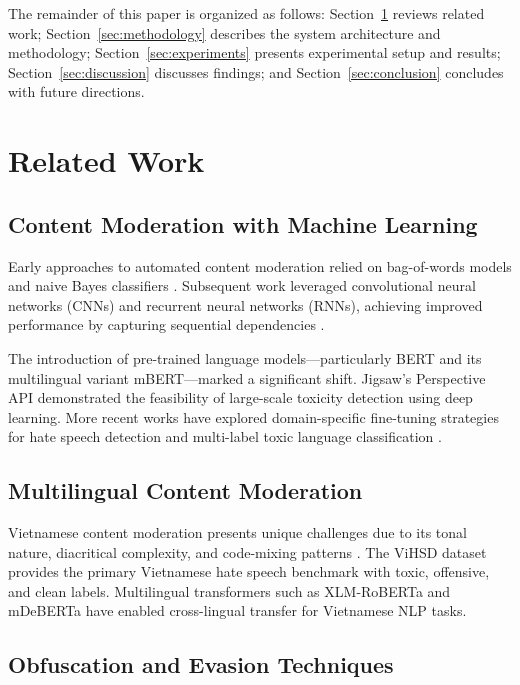 \documentclass[12pt,a4paper]{article}
\begin{document}
The remainder of this paper is organized as follows: Section~\ref{sec:related} reviews related work; Section~\ref{sec:methodology} describes the system architecture and methodology; Section~\ref{sec:experiments} presents experimental setup and results; Section~\ref{sec:discussion} discusses findings; and Section~\ref{sec:conclusion} concludes with future directions.

\section{Related Work}
\label{sec:related}

\subsection{Content Moderation with Machine Learning}

Early approaches to automated content moderation relied on bag-of-words models and naive Bayes classifiers \cite{warner2012detecting}.
Subsequent work leveraged convolutional neural networks (CNNs) and recurrent neural networks (RNNs), achieving improved performance by capturing sequential dependencies \cite{zhang2018leveraging, konchady2022using}.

The introduction of pre-trained language models---particularly BERT \cite{devlin2019bert} and its multilingual variant mBERT---marked a significant shift.
Jigsaw's Perspective API demonstrated the feasibility of large-scale toxicity detection using deep learning.
More recent works have explored domain-specific fine-tuning strategies for hate speech detection \cite{liang2022hatebert} and multi-label toxic language classification \cite{hanu2020detoxify}.

\subsection{Multilingual Content Moderation}

Vietnamese content moderation presents unique challenges due to its tonal nature, diacritical complexity, and code-mixing patterns \cite{nguyen2020hate}.
The ViHSD dataset \cite{nguyen2020hate} provides the primary Vietnamese hate speech benchmark with toxic, offensive, and clean labels.
Multilingual transformers such as XLM-RoBERTa \cite{conneau2020xlmr} and mDeBERTa \cite{he2020deberta} have enabled cross-lingual transfer for Vietnamese NLP tasks.

\subsection{Obfuscation and Evasion Techniques}
\end{document}
